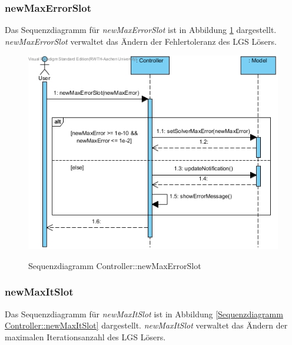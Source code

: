\subsubsection*{newMaxErrorSlot}

Das Sequenzdiagramm für \emph{newMaxErrorSlot} ist in Abbildung \ref{Sequenzdiagramm Controller::newMaxErrorSlot} dargestellt. \emph{newMaxErrorSlot} verwaltet das Ändern der Fehlertoleranz des LGS Lösers.

\begin{figure}[H]
	\centering
	\includegraphics[scale=.7]{Bilder/Controller__newMaxErrorSlot().jpg}\\
	\caption{Sequenzdiagramm Controller::newMaxErrorSlot}
	\label{Sequenzdiagramm Controller::newMaxErrorSlot}
\end{figure}

\subsubsection*{newMaxItSlot}

Das Sequenzdiagramm für \emph{newMaxItSlot} ist in Abbildung \ref{Sequenzdiagramm Controller::newMaxItSlot} dargestellt. \emph{newMaxItSlot} verwaltet das Ändern der maximalen Iterationsanzahl des LGS Lösers.

